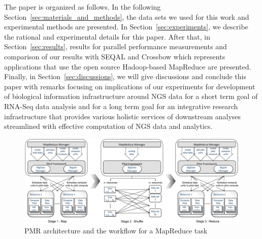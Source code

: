 \documentclass{sig-alternate}
\begin{document}
{The paper is organized as follows. In the following
Section~\ref{sec:materials_and_methods}, the data sets we used for
this work and experimental methods are presented.  In
Section~\ref{sec:experiments}, we describe the rational and
experimental details for this paper.  After that, in
Section~\ref{sec:results}, results for parallel performance
measurements and comparison of our results with SEQAL and Crossbow
which represents applications that use the open source Hadoop-based
MapReduce\cite{hadoop-url, taylor2010,seal_2011_mapred,seal2011} are
presented.  Finally, in Section~\ref{sec:discussions}, we will give
discussions and conclude this paper with remarks focusing on
implications of our experiments for development of biological
information infrastructure around NGS data for a short term goal of
RNA-Seq data analysis and for a long term goal for an integrative
research infrastructure that provides various holistic services of
downstream analyses streamlined with effective computation of NGS data
and analytics.

\begin{center}
\hfill{}
\begin{figure}
 \centering
\includegraphics[scale=0.35]{figures/F1_1.pdf} 
\hfill{}
\caption{\small PMR architecture and the workflow for a MapReduce task}
  \label{fig:arch-pj-saga-mr} 
\end{figure}
\end{center}


}
\end{document}
